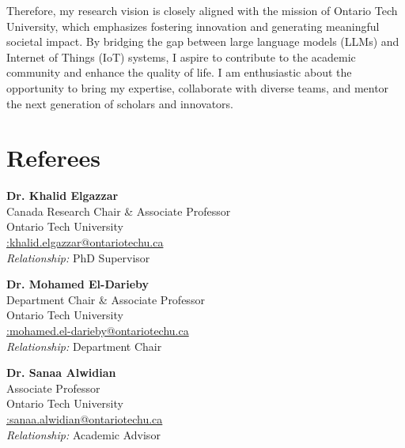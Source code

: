 \documentclass[10pt, letterpaper]{article}
\newcommand{\university }{Ontario Tech University}
\let\hrefWithoutArrow\href
\renewcommand{\href}[2]{\hrefWithoutArrow{#1}{\ifthenelse{\equal{#2}{}}{ }{#2 }\raisebox{.15ex}{\footnotesize \faExternalLink*}}}
\begin{document}
Therefore, my research vision is closely aligned with the mission of \university, which emphasizes fostering innovation and generating meaningful societal impact. By bridging the gap between large language models (LLMs) and Internet of Things (IoT) systems, I aspire to contribute to the academic community and enhance the quality of life. I am enthusiastic about the opportunity to bring my expertise, collaborate with diverse teams, and mentor the next generation of scholars and innovators. 









 
\section{Referees }


\textbf{Dr. Khalid Elgazzar} \\
Canada Research Chair \& Associate Professor \\
Ontario Tech University \\
{\hrefWithoutArrow{mailto:khalid.elgazzar@ontariotechu.ca}{{\footnotesize\faEnvelope[regular]} :\hspace*{0.13cm}khalid.elgazzar@ontariotechu.ca}}\\
\textit{Relationship:} PhD Supervisor

\vspace{0.5em}

\textbf{Dr. Mohamed El-Darieby} \\
Department Chair \& Associate Professor\\
Ontario Tech University \\
{\hrefWithoutArrow{mailto:mohamed.el-darieby@ontariotechu.ca}{{\footnotesize\faEnvelope[regular]} :\hspace*{0.13cm}mohamed.el-darieby@ontariotechu.ca}}\\
\textit{Relationship:} Department Chair

\vspace{0.5em}

\textbf{Dr. Sanaa Alwidian} \\
Associate Professor\\
Ontario Tech University \\
{\hrefWithoutArrow{mailto:sanaa.alwidian@ontariotechu.ca}{{\footnotesize\faEnvelope[regular]} :\hspace*{0.13cm}sanaa.alwidian@ontariotechu.ca}}\\
\textit{Relationship:} Academic Advisor
\end{document}
